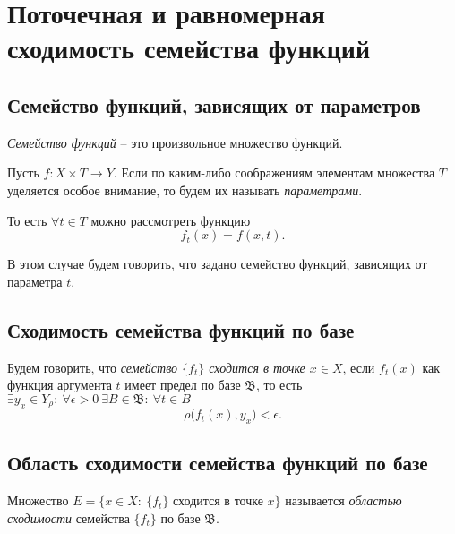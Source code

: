 \section{Поточечная и равномерная сходимость семейства функций}

\setcounter{subsection}{66}

\subsection{Семейство функций, зависящих от параметров}

\begin{definition}
    \emph{Семейство функций} -- это произвольное множество функций.

    Пусть $f:X\times T \rightarrow Y$. Если по каким-либо соображениям элементам множества $T$ уделяется особое внимание, то будем их называть \emph{параметрами}.

    То есть $\forall t \in T$ можно рассмотреть функцию
    \[
        f_t(x) = f(x,t).
    \]

    В этом случае будем говорить, что задано семейство функций, зависящих от параметра $t$.
\end{definition}

\subsection{Сходимость семейства функций по базе}

\begin{definition}
    Будем говорить, что \emph{семейство $\{f_t\}$ сходится в точке $x \in X$}, если $f_t(x)$ как функция аргумента $t$ имеет предел по базе $\mathfrak{B}$, то есть $\exists y_x \in Y_\rho: \ \forall \epsilon > 0 \ \exists B \in \mathfrak{B}: \ \forall t \in B$
    \[
        \rho\big(f_t(x),y_x\big) < \epsilon.
    \]
\end{definition}

\subsection{Область сходимости семейства функций по базе}

\begin{definition}
    Множество $E = \big\{x \in X : \ \{f_t\}$ сходится в точке $x\big\}$ называется \emph{областью сходимости} семейства $\{f_t\}$ по базе $\mathfrak{B}$.
\end{definition}

